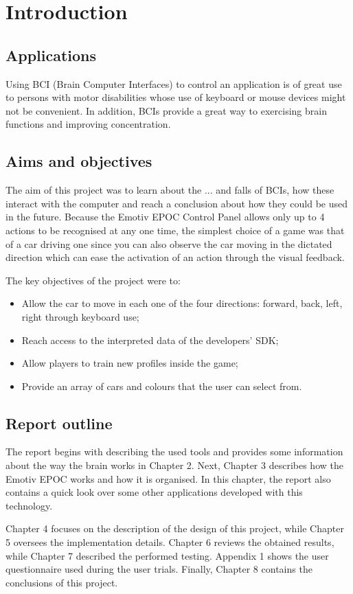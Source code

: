 \chapter{Introduction}
\label{cha:intro}

\section{Applications}

Using BCI (Brain Computer Interfaces) to control an application is of great use to persons with motor disabilities whose use of keyboard or mouse devices might not be convenient. In addition,  BCIs provide a great way to exercising brain functions and improving concentration.

\section{Aims and objectives}

The aim of this project was to learn about the ... and falls of BCIs, how these interact with the computer and reach a conclusion about how they could be used in the future. Because the Emotiv EPOC Control Panel allows only up to 4 actions to be recognised at any one time, the simplest choice of a game was that of a car driving one since you can also observe the car moving in the dictated direction which can ease the activation of an action through the visual feedback.

The key objectives of the project were to:
\begin{itemize}
	\item Allow the car to move in each one of the four directions: forward, back, left, right through keyboard use; 
	\item Reach access to the interpreted data of the developers' SDK;
	\item Allow players to train new profiles inside the game;
	\item Provide an array of cars and colours that the user can select from.
\end{itemize}

\section{Report outline}

The report begins with describing the used tools and provides some information about the way the brain works in Chapter 2. Next, Chapter 3 describes how the Emotiv EPOC works and how it is organised. In this chapter, the report also contains a quick look over some other applications developed with this technology.

Chapter 4 focuses on the description of the design of this project, while Chapter 5 oversees the implementation details. Chapter 6 reviews the obtained results, while Chapter 7 described the performed testing. Appendix 1 shows the user questionnaire used during the user trials. Finally, Chapter 8 contains the conclusions of this project.